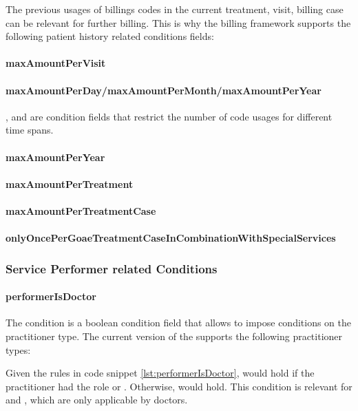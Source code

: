 The previous usages of billings codes in the current treatment, visit, billing case can be relevant for further billing.
This is why the billing framework supports the following patient history related conditions fields:

\paragraph{maxAmountPerVisit}
\paragraph{maxAmountPerDay/maxAmountPerMonth/maxAmountPerYear}

,  and  are condition fields that restrict the number of code usages for different time spans.


\paragraph{maxAmountPerYear}
\paragraph{maxAmountPerTreatment}
\paragraph{maxAmountPerTreatmentCase}
\paragraph{onlyOncePerGoaeTreatmentCaseInCombinationWithSpecialServices}


\subsubsection{Service Performer related Conditions}

\paragraph{performerIsDoctor}
The  condition is a boolean condition field that allows to impose conditions on the practitioner type.
The current version of the \AVS supports the following practitioner types:



Given the rules in code snippet \ref{lst:performerIsDoctor},  would hold if the practitioner had the role 
or .
Otherwise,  would hold.
This condition is relevant for  and , which are only applicable by doctors.



